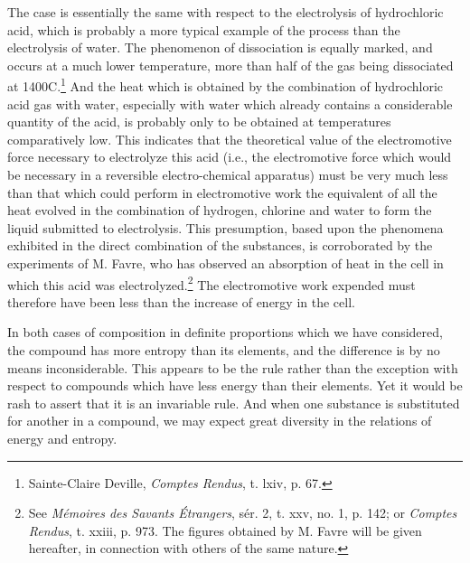 \documentclass[12pt]{article}
\begin{document}
The case is essentially the same with respect to the electrolysis of hydrochloric acid, which is probably a more typical example of the process than the electrolysis of water. The phenomenon of dissociation is equally marked, and occurs at a much lower temperature, more than half of the gas being dissociated at 1400\degree C.\footnote{Sainte-Claire Deville, \textit{Comptes Rendus}, t. lxiv, p. 67.} And the heat which is obtained by the combination of hydrochloric acid gas with water, especially with water which already contains a considerable quantity of the acid, is probably only to be obtained at temperatures comparatively low. This indicates that the theoretical value of the electromotive force necessary to electrolyze this acid (i.e., the electromotive force which would be necessary in a reversible electro-chemical apparatus) must be very much less than that which could perform in electromotive work the equivalent of all the heat evolved in the combination of hydrogen, chlorine and water to form the liquid submitted to electrolysis. This presumption, based upon the phenomena exhibited in the direct combination of the substances, is corroborated by the experiments of M. Favre, who has observed an absorption of heat in the cell in which this acid was electrolyzed.\footnote{See \textit{M\'{e}moires des Savants \'{E}trangers}, s\'{e}r. 2, t. xxv, no. 1, p. 142; or \textit{Comptes Rendus}, t. xxiii, p. 973. The figures obtained by M. Favre will be given hereafter, in connection with others of the same nature.} The electromotive work expended must therefore have been less than the increase of energy in the cell.

In both cases of composition in definite proportions which we have considered, the compound has more entropy than its elements, and the difference is by no means inconsiderable. This appears to be the rule rather than the exception with respect to compounds which have less energy than their elements. Yet it would be rash to assert that it is an invariable rule. And when one substance is substituted for another in a compound, we may expect great diversity in the relations of energy and entropy.
\end{document}

